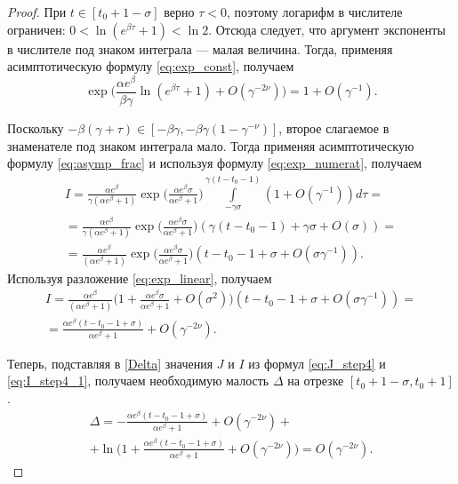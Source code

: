 \begin{proof}
При $t \in [t_0 + 1 - \sigma]$ верно $\tau < 0$, поэтому логарифм в числителе ограничен: $0 < \ln(e^{\beta\tau} + 1) < \ln 2$. Отсюда следует, что аргумент экспоненты в числителе под знаком интеграла --- малая величина. Тогда, применяя асимптотическую формулу \eqref{eq:exp_const}, получаем
\begin{equation}
	\label{eq:exp_numerat}
	\exp\Big( \frac{\alpha e^\beta}{\beta \gamma}\ln(e^{\beta\tau}+1) +O(\gamma^{-2\nu})\Big) = 1 + O(\gamma^{-1}).
\end{equation}

Поскольку $-\beta(\gamma + \tau) \in [-\beta\gamma, -\beta\gamma(1-\gamma^{-\nu})]$, второе слагаемое в знаменателе под знаком интеграла мало. Тогда применяя асимптотическую формулу \eqref{eq:asymp_frac} и используя формулу \eqref{eq:exp_numerat}, получаем
\begin{multline*}
	I=\frac{\alpha e^\beta}{\gamma(\alpha e^{\beta}+1)}\exp\Big(\frac{\alpha e^{\beta}\sigma}{\alpha e^\beta+1}\Big)
	\int\limits_{-\gamma\sigma}^{\gamma(t-t_0-1)}(1+O(\gamma^{-1}))d\tau
	=\\
	=\frac{\alpha e^\beta}{\gamma(\alpha e^{\beta}+1)}\exp\Big(\frac{\alpha e^{\beta}\sigma}{\alpha e^\beta+1}\Big)(\gamma(t - t_0 - 1) + \gamma\sigma + O(\sigma))
	=\\
	=\frac{\alpha e^\beta}{(\alpha e^{\beta}+1)}\exp\Big(\frac{\alpha e^{\beta}\sigma}{\alpha e^\beta+1}\Big)(t-t_0-1+\sigma+O(\sigma\gamma^{-1})).
\end{multline*}
Используя разложение \eqref{eq:exp_linear}, получаем
\begin{multline}
	\label{eq:I_step4_1}
	I = \frac{\alpha e^\beta}{(\alpha e^{\beta} + 1)}\Big(1 + \frac{\alpha e^{\beta}\sigma}{\alpha e^\beta+1} + O(\sigma^2)\Big)(t-t_0-1+\sigma+O(\sigma\gamma^{-1})) = \\
	= \frac{\alpha e^\beta(t-t_0-1+\sigma)}{\alpha e^\beta+1}+O(\gamma^{-2\nu}).
\end{multline}

Теперь, подставляя в \eqref{Delta} значения $J$ и $I$ из формул \eqref{eq:J_step4} и \eqref{eq:I_step4_1}, получаем необходимую малость $\Delta$ на отрезке $[t_0 + 1 - \sigma, t_0 + 1]$.
%
\begin{multline}
	\label{Delta_step4}
	\Delta=-\frac{\alpha e^\beta(t-t_0-1+\sigma)}{\alpha e^\beta+1}+O(\gamma^{-2\nu}) + \\
	+ \ln\Big(1+\frac{\alpha e^\beta(t-t_0-1+\sigma)}{\alpha e^\beta+1}+O(\gamma^{-2\nu})\Big)=O(\gamma^{-2\nu}).
\end{multline}



\end{proof}
